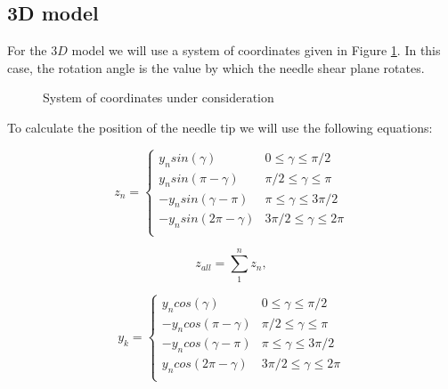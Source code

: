 \documentclass[a4paper]{jpconf}
\begin{document}
\subsection{3D model}

For the $3D$ model we will use a system of coordinates given in Figure  \ref{n2}. In this case, the rotation angle is the value by which the needle shear plane rotates.

\begin{figure}[h]
\caption{System of coordinates under consideration}
\label{n2}
\end{figure}

To calculate the position of the needle tip we will use the following equations:

\begin{equation} \label{eq7}
z_{n} = 
 \begin{cases}
   y_{n} sin(\gamma) &{ 0 \leq \gamma \leq \pi/2 }\\
   y_{n} sin(\pi - \gamma) &{ \pi/2 \leq \gamma \leq \pi }\\
  - y_{n} sin( \gamma - \pi) &{ \pi \leq \gamma \leq 3\pi/2 }\\
   - y_{n} sin(2\pi -  \gamma) &{ 3\pi/2 \leq \gamma \leq 2\pi }\\
 \end{cases}
\end{equation}

\begin{equation} \label{eq8}
z_{all} = \sum\limits_{1}^{n} z_{n},
\end{equation}

\begin{equation} \label{eq9}
y_{k} = 
 \begin{cases}
   y_{n} cos(\gamma) &{ 0 \leq \gamma \leq \pi/2 }\\
   - y_{n} cos(\pi - \gamma) &{ \pi/2 \leq \gamma \leq \pi }\\
  - y_{n} cos( \gamma - \pi) &{ \pi \leq \gamma \leq 3\pi/2 }\\
    y_{n} cos(2\pi -  \gamma) &{ 3\pi/2 \leq \gamma \leq 2\pi }\\
 \end{cases}
\end{equation}
\end{document}
